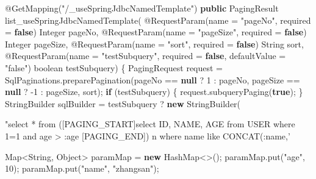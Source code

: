 \documentclass[
]{book}
\newenvironment{Shaded}{\begin{snugshade}}{\end{snugshade}}
\newcommand{\AttributeTok}[1]{\textcolor[rgb]{0.77,0.63,0.00}{#1}}
\newcommand{\BuiltInTok}[1]{#1}
\newcommand{\DataTypeTok}[1]{\textcolor[rgb]{0.13,0.29,0.53}{#1}}
\newcommand{\DecValTok}[1]{\textcolor[rgb]{0.00,0.00,0.81}{#1}}
\newcommand{\FunctionTok}[1]{\textcolor[rgb]{0.00,0.00,0.00}{#1}}
\newcommand{\KeywordTok}[1]{\textcolor[rgb]{0.13,0.29,0.53}{\textbf{#1}}}
\newcommand{\NormalTok}[1]{#1}
\newcommand{\StringTok}[1]{\textcolor[rgb]{0.31,0.60,0.02}{#1}}
\begin{document}
\begin{Shaded}
\begin{Highlighting}[]
{{    \AttributeTok{@GetMapping}\NormalTok{(}\StringTok{"/_useSpringJdbcNamedTemplate"}\NormalTok{)}
    \KeywordTok{public}\NormalTok{ PagingResult }\FunctionTok{list_useSpringJdbcNamedTemplate}\NormalTok{(}
            \AttributeTok{@RequestParam}\NormalTok{(name = }\StringTok{"pageNo"}\NormalTok{, required = }\KeywordTok{false}\NormalTok{) }\BuiltInTok{Integer}\NormalTok{ pageNo,}
            \AttributeTok{@RequestParam}\NormalTok{(name = }\StringTok{"pageSize"}\NormalTok{, required = }\KeywordTok{false}\NormalTok{) }\BuiltInTok{Integer}\NormalTok{ pageSize,}
            \AttributeTok{@RequestParam}\NormalTok{(name = }\StringTok{"sort"}\NormalTok{, required = }\KeywordTok{false}\NormalTok{) }\BuiltInTok{String}\NormalTok{ sort,}
            \AttributeTok{@RequestParam}\NormalTok{(name = }\StringTok{"testSubquery"}\NormalTok{, required = }\KeywordTok{false}\NormalTok{, defaultValue = }\StringTok{"false"}\NormalTok{) }\DataTypeTok{boolean}\NormalTok{ testSubquery) \{}
\NormalTok{        PagingRequest request = SqlPaginations.}\FunctionTok{preparePagination}\NormalTok{(pageNo == }\KeywordTok{null}\NormalTok{ ? }\DecValTok{1}\NormalTok{ : pageNo, pageSize == }\KeywordTok{null}\NormalTok{ ? -}\DecValTok{1}\NormalTok{ : pageSize, sort);}
        \KeywordTok{if}\NormalTok{ (testSubquery) \{}
\NormalTok{            request.}\FunctionTok{subqueryPaging}\NormalTok{(}\KeywordTok{true}\NormalTok{);}
\NormalTok{        \}}
        \BuiltInTok{StringBuilder}\NormalTok{ sqlBuilder = testSubquery ? }\KeywordTok{new} \BuiltInTok{StringBuilder}\NormalTok{(}\StringTok{"select * from ([PAGING_START]select ID, NAME, AGE from USER where 1=1 and age > :age [PAGING_END]) n where name like CONCAT(:name,'%') "}\NormalTok{) : }\KeywordTok{new} \BuiltInTok{StringBuilder}\NormalTok{(}\StringTok{"select ID, NAME, AGE from USER where 1=1 and age > :age"}\NormalTok{);}

        \BuiltInTok{Map}\NormalTok{<}\BuiltInTok{String}\NormalTok{, }\BuiltInTok{Object}\NormalTok{> paramMap = }\KeywordTok{new} \BuiltInTok{HashMap}\NormalTok{<>();}
\NormalTok{        paramMap.}\FunctionTok{put}\NormalTok{(}\StringTok{"age"}\NormalTok{, }\DecValTok{10}\NormalTok{);}
\NormalTok{        paramMap.}\FunctionTok{put}\NormalTok{(}\StringTok{"name"}\NormalTok{, }\StringTok{"zhangsan"}\NormalTok{);}

}}}
\end{Highlighting}
\end{Shaded}
\end{document}
